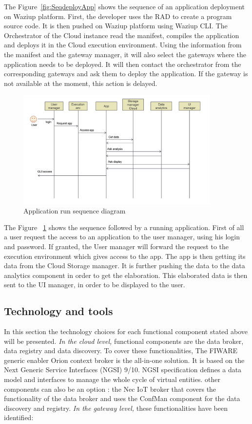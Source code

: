 The Figure~\ref{fig:SeqdeployApp} shows the sequence of an application deployment on Waziup platform.
First, the developer uses the RAD to create a program source code. It is then pushed on Waziup platform using Waziup CLI.
The Orchestrator of the Cloud instance read the manifest, compiles the application and deploys it in the Cloud execution environment.
Using the information from the manifest and the gateway manager, it will also select the gateways where the application needs to be deployed.
It will then contact the orchestrator from the corresponding gateways and ask them to deploy the application.
If the gateway is not available at the moment, this action is delayed.

\begin{figure}[h!]
\centering
\includegraphics[width=0.9\textwidth]{figs/seqRunApp.png}
\caption{Application run sequence diagram}
\label{fig:seqRunApp}
\end{figure}

The Figure ~\ref{fig:seqRunApp} shows the sequence followed by a running application. First of all a user request the access to an application to the user manager, using his login and password. If granted, the User manager will forward the request to the execution environment which gives access to the app. The app is then getting its data from the Cloud Storage manager. It is further pushing the data to the data analytics component in order to get the elaboration. This elaborated data is then sent to the UI manager, in order to be displayed to the user.

\subsection{Technology and tools}

In this section the technology choices for each functional component stated above will be presented.
\emph{ In the cloud level,} functional components are the data broker, data registry and data discovery.
To cover these functionalities, The FIWARE generic enabler Orion context broker is the all-in-one solution.
It is based on the Next Generic Service Interfaces (NGSI) 9/10.
NGSI specification defines a data model and interfaces to manage the whole cycle of virtual entities.  
other components can also be an option : the Nec IoT broker that covers the functionality of the data broker and uses the ConfMan component for the data discovery and registry.
\emph{In the gateway level,} these functionalities have been identified:

